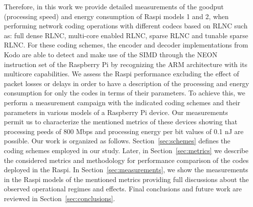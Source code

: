 Therefore, in this work we provide detailed measurements of the goodput (processing
speed) and energy consumption of \ac{Raspi} models 1 and 2, when
performing network coding operations with different codecs based on \ac{RLNC}
such as: full dense \ac{RLNC}, multi-core enabled \ac{RLNC}, sparse \ac{RLNC}
and tunable sparse \ac{RLNC}. For these coding schemes, the encoder and decoder
implementations from Kodo are able to detect and make use of the \ac{SIMD}
through the NEON instruction set of the Raspberry Pi by recognizing the \ac{ARM}
architecture with its multicore capabilities. We assess
the \ac{Raspi} performance excluding the effect of packet losses or delays in
order to have a description of the processing and energy consumption for only the
codes in terms of their parameters. To achieve this, we perform a measurement
campaign with the indicated coding schemes and their parameters in various models
of a Raspberry Pi device. Our measurements permit us to characterize the mentioned
metrics of these devices showing that processing peeds of 800 Mbps and processing
energy per bit values of 0.1 nJ are possible. Our work is organized as follows.
Section~\ref{sec:schemes} defines the
coding schemes employed in our study. Later, in Section~\ref{sec:metrics}
we describe the considered metrics and methodology for performance comparison
of the codes deployed in the \ac{Raspi}. In Section~\ref{sec:measurements}, we
show the measurements in the \ac{Raspi} models of the mentioned metrics
providing full discussions about the observed operational regimes and effects.
Final conclusions and future work are reviewed in
Section~\ref{sec:conclusions}.

